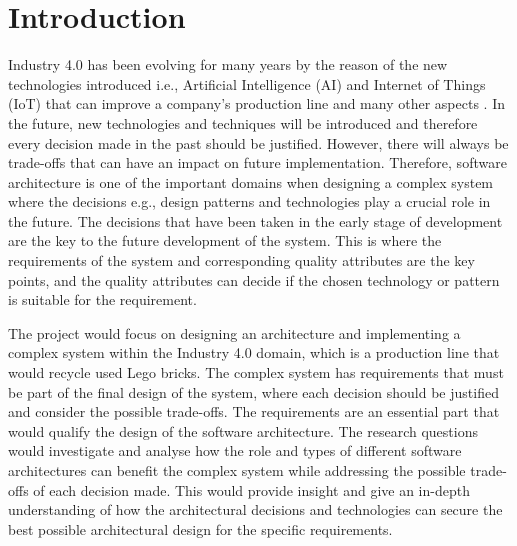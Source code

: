 \section{Introduction}
Industry 4.0 has been evolving for many years by the reason of the new technologies introduced i.e., Artificial Intelligence (AI) and Internet of Things (IoT) that can improve a company's production line and many other aspects \cite{9667102}. In the future, new technologies and techniques will be introduced and therefore every decision made in the past should be justified. However, there will always be trade-offs that can have an impact on future implementation. Therefore, software architecture is one of the important domains when designing a complex system where the decisions e.g., design patterns and technologies play a crucial role in the future. The decisions that have been taken in the early stage of development are the key to the future development of the system. This is where the requirements of the system and corresponding quality attributes are the key points, and the quality attributes can decide if the chosen technology or pattern is suitable for the requirement. 

 The project would focus on designing an architecture and implementing a complex system within the Industry 4.0 domain, which is a production line that would recycle used Lego bricks. The complex system has requirements that must be part of the final design of the system, where each decision should be justified and consider the possible trade-offs. The requirements are an essential part that would qualify the design of the software architecture. The research questions would investigate and analyse how the role and types of different software architectures can benefit the complex system while addressing the possible trade-offs of each decision made. This would provide insight and give an in-depth understanding of how the architectural decisions and technologies can secure the best possible architectural design for the specific requirements.
